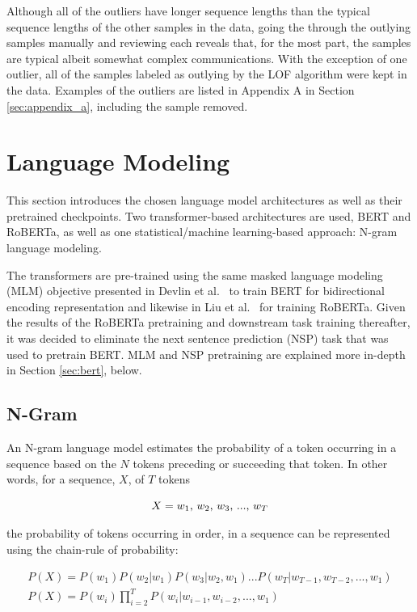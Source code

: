 \documentclass[12pt]{article}
\begin{document}
Although all of the outliers have longer sequence lengths than the typical sequence lengths of the other samples in the data, going the through the
outlying samples manually and reviewing each reveals that, for the most part, the samples are typical albeit somewhat complex communications.
With the exception of one outlier, all of the samples labeled as outlying by the LOF algorithm were kept in the data. Examples of the outliers are
listed in Appendix A in Section \ref{sec:appendix_a}, including the sample removed.

\section{Language Modeling}\label{sec:language_modeling}
This section introduces the chosen language model architectures as well as their pretrained checkpoints. Two transformer-based architectures are used,
BERT and RoBERTa, as well as one statistical/machine learning-based approach: N-gram language modeling.

The transformers are pre-trained using the same masked language modeling (MLM) objective presented in Devlin et al.~\cite{devlin_bert_2019} to train
BERT for bidirectional encoding representation and likewise in Liu et al.~\cite{liu_roberta_2019} for training RoBERTa. Given the results of the
RoBERTa pretraining and downstream task training thereafter, it was decided to eliminate the next sentence prediction (NSP) task that was used to
pretrain BERT. MLM and NSP pretraining are explained more in-depth in Section \ref{sec:bert}, below.

\subsection{N-Gram}\label{sec:ngram}
An N-gram language model estimates the probability of a token occurring in a sequence based on the \(N\) tokens preceding or succeeding that token.
In other words, for a sequence, $X$, of $T$ tokens

\begin{equation}\label{eq:ngram_sequence}
    X = \mbox{$w_1$, $w_2$, $w_3$, ..., $w_T$}\\
\end{equation}

\noindent
the probability of tokens occurring in order, in a sequence can be represented using the chain-rule of probability:

\begin{equation}
    \begin{gathered}
        P(X) = P(w_1) P(w_2|w_1) P(w_3|w_2, w_1) ... P(w_T|w_{T-1}, w_{T-2}, ..., w_1)\\
        P(X) = P(w_i)\prod_{i=2}^{T} P(w_i|w_{i-1}, w_{i-2}, ..., w_1)
    \end{gathered}
\end{equation}
\end{document}
